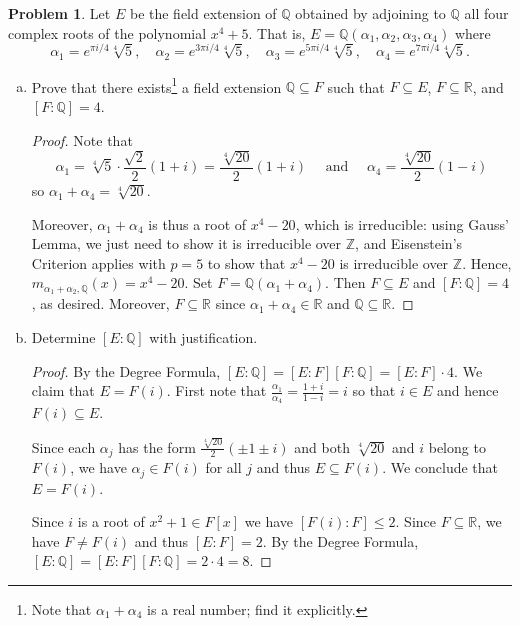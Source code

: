 \documentclass[11pt]{article}
\newcommand{\Q}{\mathbb{Q}}
\newcommand{\Z}{\mathbb{Z}}
\newcommand{\R}{\mathbb{R}}
\theoremstyle{definition}
\newtheorem{problem}{Problem}
\begin{document}
\begin{problem}
Let $E$ be the field extension of $\Q$ obtained by adjoining to $\Q$ all four complex roots of the polynomial $x^4 + 5$.
That is, $E = \Q(\alpha_1, \alpha_2, \alpha_3, \alpha_4)$ where
$$\alpha_1 = e^{\pi i/4}\sqrt[4]{5}, \quad
\alpha_2 = e^{3\pi i/4}\sqrt[4]{5}, \quad
\alpha_3 = e^{5\pi i/4}\sqrt[4]{5}, \quad
\alpha_4 = e^{7\pi i/4}\sqrt[4]{5}.$$

\begin{enumerate}[(a)]
\item Prove that there exists\footnote{Note that $\alpha_1 + \alpha_4$ is a real number; find it explicitly.} 
 a field extension $\Q \subseteq F$ such that $F \subseteq E$, $F \subseteq \R$, and $[F :\Q]=4$.

	\begin{proof} 
Note that 
$$\alpha_1 = \sqrt[4]{5} \cdot \frac{\sqrt{2}}{2} (1 + i) = \frac{\sqrt[4]{20}}{2}(1+i) \quad \textrm{ and } \quad \alpha_4 =\frac{\sqrt[4]{20}}{2}(1-i)$$ 
so $\alpha_1 + \alpha_4 = \sqrt[4]{20}$.
         
Moreover, $\alpha_1 + \alpha_4$ is thus a root of $x^4 - 20$, which is irreducible: using Gauss' Lemma, we just need to show it is irreducible over $\Z$, and Eisenstein's Criterion applies with $p = 5$ to show that $x^4-20$ is irreducible over $\Z$. Hence, $m_{\alpha_1+\alpha_2, \Q}(x) = x^4 -20$.
Set $F = \Q(\alpha_1 + \alpha_4)$. Then $F \subseteq E$ and $[F :\Q]=4$, as desired. Moreover, $F \subseteq \R$ since $\alpha_1 + \alpha_4 \in \R$ and $\Q \subseteq \R$.
\end{proof}


\item Determine $[E : \Q]$ with justification.

		\begin{proof} 
By the Degree Formula, $[E: \Q] = [E:F][F:\Q] = [E:F] \cdot 4$. We claim that $E = F(i)$. First note that $\frac{\alpha_1}{\alpha_4} = \frac{1+i}{1-i} = i$ so that $i \in E$ and hence $F(i)
          \subseteq E$. 
          
Since each $\alpha_j$ has the form $\frac{\sqrt[4]{20}}{2}(\pm 1 \pm i)$ and both $\sqrt[4]{20}$ and $i$ belong to $F(i)$, we have $\alpha_j \in F(i)$ for all $j$ and thus $E \subseteq F(i)$. We conclude that $E = F(i)$.

 Since $i$ is a root of $x^2 + 1 \in F[x]$ we have $[F(i): F] \leqslant 2$. Since $F \subseteq \R$, we have $F \neq F(i)$ and thus $[E: F] = 2$. By the Degree Formula, $[E: \Q] = [E : F] [F:\Q] = 2 \cdot 4 = 8$.
\end{proof}
\end{enumerate}
\end{problem}
\end{document}
